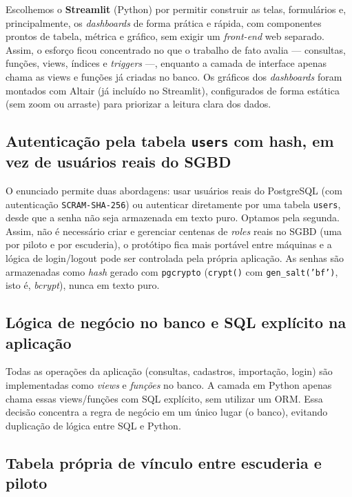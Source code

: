 \documentclass[12pt,a4paper]{article}
\begin{document}
Escolhemos o \textbf{Streamlit} (Python) por permitir construir as telas, formulários e, principalmente, os \textit{dashboards} de forma prática e rápida, com componentes prontos de tabela, métrica e gráfico, sem exigir um \textit{front-end} web separado. Assim, o esforço ficou concentrado no que o trabalho de fato avalia --- consultas, funções, views, índices e \textit{triggers} ---, enquanto a camada de interface apenas chama as views e funções já criadas no banco. Os gráficos dos \textit{dashboards} foram montados com Altair (já incluído no Streamlit), configurados de forma estática (sem zoom ou arraste) para priorizar a leitura clara dos dados.

\subsection{Autenticação pela tabela \texttt{users} com hash, em vez de usuários reais do SGBD}

O enunciado permite duas abordagens: usar usuários reais do PostgreSQL (com autenticação \texttt{SCRAM-SHA-256}) ou autenticar diretamente por uma tabela \texttt{users}, desde que a senha não seja armazenada em texto puro. Optamos pela segunda. Assim, não é necessário criar e gerenciar centenas de \textit{roles} reais no SGBD (uma por piloto e por escuderia), o protótipo fica mais portável entre máquinas e a lógica de login/logout pode ser controlada pela própria aplicação. As senhas são armazenadas como \textit{hash} gerado com \texttt{pgcrypto} (\texttt{crypt()} com \texttt{gen\_salt('bf')}, isto é, \textit{bcrypt}), nunca em texto puro.

\subsection{Lógica de negócio no banco e SQL explícito na aplicação}

Todas as operações da aplicação (consultas, cadastros, importação, login) são implementadas como \emph{views} e \emph{funções} no banco. A camada em Python apenas chama essas views/funções com SQL explícito, sem utilizar um ORM. Essa decisão concentra a regra de negócio em um único lugar (o banco), evitando duplicação de lógica entre SQL e Python.

\subsection{Tabela própria de vínculo entre escuderia e piloto}
\end{document}
